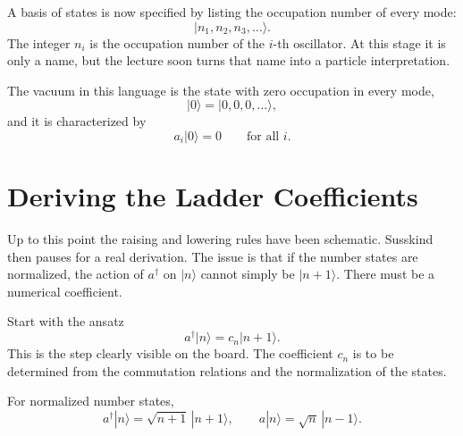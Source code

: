 A basis of states is now specified by listing the occupation number of every mode:
\begin{equation}
|n_1,n_2,n_3,\ldots\rangle.
\end{equation}
The integer \(n_i\) is the occupation number of the \(i\)-th oscillator. At this stage it is only a name, but the lecture soon turns that name into a particle interpretation.

The vacuum in this language is the state with zero occupation in every mode,
\begin{equation}
|0\rangle = |0,0,0,\ldots\rangle,
\end{equation}
and it is characterized by
\begin{equation}
a_i|0\rangle = 0 \qquad \text{for all } i.
\end{equation}

\section{Deriving the Ladder Coefficients}

Up to this point the raising and lowering rules have been schematic. Susskind then pauses for a real derivation. The issue is that if the number states are normalized, the action of \(a^\dagger\) on \(|n\rangle\) cannot simply be \(|n+1\rangle\). There must be a numerical coefficient.

Start with the ansatz
\begin{equation}
a^\dagger |n\rangle = c_n |n+1\rangle.
\end{equation}
This is the step clearly visible on the board. The coefficient \(c_n\) is to be determined from the commutation relations and the normalization of the states.

\begin{proposition}
For normalized number states,
\begin{equation}
a^\dagger |n\rangle = \sqrt{n+1}\,|n+1\rangle,
\qquad
a|n\rangle = \sqrt{n}\,|n-1\rangle.
\end{equation}
\end{proposition}

